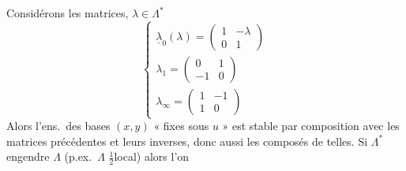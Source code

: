 \documentclass[11pt,a4paper]{article}
\begin{document}
 Considérons les matrices, $\lambda\in\Lambda^{*}$
\[
\left\{
\begin{array}{l}
\underline{\lambda}_0(\lambda) = \begin{pmatrix} 1 & -\lambda\\ 0 & 1\end{pmatrix}\\[10pt]
\lambda_1 = \begin{pmatrix} 0 & 1\\ -1 & 0\end{pmatrix}\\[10pt]
\lambda_\infty = \begin{pmatrix} 1 & -1\\ 1 & 0\end{pmatrix}
\end{array}
\right.
\]
Alors l'ens.\ des bases $(x,y)$ « fixes sous $u$ » est stable par composition avec les matrices précédentes et leurs inverses, donc aussi les composés de telles. Si $\Lambda^{*}$ engendre $\Lambda$  (p.ex.\ $\Lambda$ $\tfrac12$local) alors \struck{\ill{}} l'on
\end{document}
